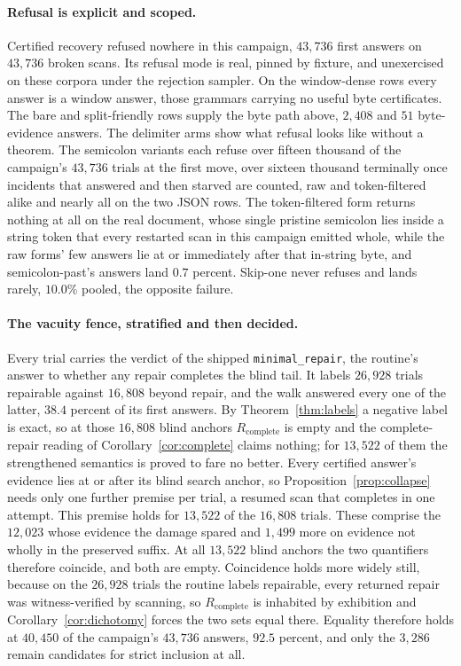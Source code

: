 \documentclass[11pt,a4paper]{article}
\theoremstyle{definition}
\theoremstyle{plain}
\theoremstyle{remark}
\newcommand{\code}[1]{\texttt{#1}}
\newcommand{\Rcomp}{R_{\mathrm{complete}}}
\begin{document}
\paragraph{Refusal is explicit and scoped.} Certified recovery refused nowhere in this campaign, $43{,}736$ first
answers on $43{,}736$ broken scans. Its refusal mode is real, pinned by fixture, and unexercised on these corpora under
the rejection sampler. On the window-dense rows every answer is a window answer, those grammars carrying no useful byte
certificates. The bare and split-friendly rows supply the byte path above, $2{,}408$ and $51$ byte-evidence answers. The
delimiter arms show what refusal looks like without a theorem. The semicolon variants each refuse over fifteen thousand
of the campaign's $43{,}736$ trials at the first move, over sixteen thousand terminally once incidents that answered and
then starved are counted, raw and token-filtered alike and nearly all on the two JSON rows. The token-filtered form
returns nothing at all on the real document, whose single pristine semicolon lies inside a string token that every
restarted scan in this campaign emitted whole, while the raw forms' few answers lie at or immediately after that
in-string byte, and semicolon-past's answers land $0.7$ percent. Skip-one never refuses and lands rarely, $10.0$\%
pooled, the opposite failure.

\paragraph{The vacuity fence, stratified and then decided.} Every trial carries the verdict of the shipped
\code{minimal\_repair}, the routine's answer to whether any repair completes the blind tail. It labels $26{,}928$ trials
repairable against $16{,}808$ beyond repair, and the walk answered every one of the latter, $38.4$ percent of its first
answers. By Theorem~\ref{thm:labels} a negative label is exact, so at those $16{,}808$ blind anchors $\Rcomp$ is empty
and the complete-repair reading of Corollary~\ref{cor:complete} claims nothing; for $13{,}522$ of them the strengthened
semantics is proved to fare no better. Every certified answer's evidence lies at or after its blind search anchor, so
Proposition~\ref{prop:collapse} needs only one further premise per trial, a resumed scan that completes in one attempt.
This premise holds for $13{,}522$ of the $16{,}808$ trials. These comprise the $12{,}023$ whose evidence the damage
spared and $1{,}499$ more on evidence not wholly in the preserved suffix. At all $13{,}522$ blind anchors the two
quantifiers therefore coincide, and both are empty. Coincidence holds more widely still, because on the $26{,}928$
trials the routine labels repairable, every returned repair was witness-verified by scanning, so $\Rcomp$ is inhabited
by exhibition and Corollary~\ref{cor:dichotomy} forces the two sets equal there. Equality therefore holds at $40{,}450$
of the campaign's $43{,}736$ answers, $92.5$ percent, and only the $3{,}286$ remain candidates for strict inclusion at
all.
\end{document}
